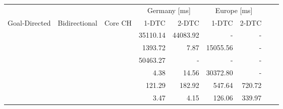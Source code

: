 \begin{tabular}{cccrrrrrr}
	\toprule
	              &               &         & \multicolumn{2}{c}{Germany [\si{\milli\second}]} & \multicolumn{2}{c}{Europe [\si{\milli\second}]}                 \\
	Goal-Directed & Bidirectional & Core CH & 1-DTC                                            & 2-DTC                                           & 1-DTC & 2-DTC \\
	\midrule
	\xmark        & \xmark        & \xmark  & 35110.14                                                & 44083.92                                               & -     & -     \\
	\cmark        & \xmark        & \xmark  & 1393.72                                                & 7.87                                               & 15055.56     & -     \\
	\xmark        & \cmark        & \xmark  & 50463.27                                                & -                                               & -     & -     \\
	\cmark        & \cmark        & \xmark  & 4.38                                                & 14.56                                               & 30372.80     & -     \\
	\xmark        & \cmark        & \cmark  & 121.29                                                & 182.92                                               & 547.64     & 720.72     \\
	\cmark        & \cmark        & \cmark  & 3.47                                                & 4.15                                               & 126.06     & 339.97     \\
	\bottomrule
\end{tabular}